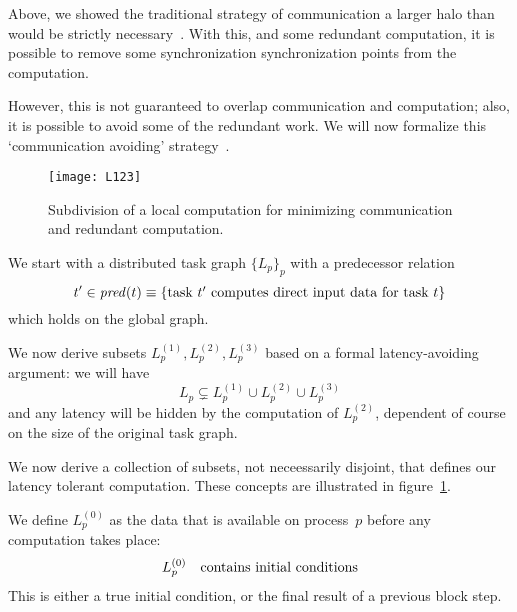 
\label{sec:avoid-framework}

Above, we showed the
traditional strategy of communication a larger halo than would be
strictly
necessary~\cite{Douglas:caching-multigrid,Eijkhout:poly-smooth,OpJo:improved-ssor}.
With this, and some redundant computation, it is possible to remove
some synchronization
synchronization points from the computation.

However, this is not guaranteed to overlap communication and
computation; also, it is possible to avoid some of the redundant work.
We will now formalize this `communication avoiding'
strategy~\cite{Demmel2008IEEE:avoiding}.

\begin{figure}[ht]
  \texttt{[image: L123]}
  \caption{Subdivision of a local computation for minimizing communication and redundant computation.}
  \label{fig:avoid}
\end{figure}

We start with a distributed task graph
$\{ L_{p} \}_{p}$ with a predecessor relation
\[ t' \in \mathop{\mathit{pred}}(t)\equiv \{\hbox{task $t'$ computes direct input data for
  task $t$}\}
\]
which holds on the global graph.

We now derive subsets
$L^{(1)}_{p},L^{(2)}_{p},L^{(3)}_{p}$
based on a formal latency-avoiding argument:
%
we will have
\[
    L_{p} \subsetneq L^{(1)}_{p} \cup L^{(2)}_{p} \cup L^{(3)}_{p}
\]
and any latency will be hidden by the computation of
$L^{(2)}_{p}$,
dependent of course on the size of the  original task graph.

We now derive a collection of subsets, not neceessarily disjoint, that
defines our latency tolerant computation.
These
concepts are illustrated in figure~\ref{fig:avoid}.


We define
$L^{(0)}_{p}$
as the data that is available
on process~$p$
before any computation takes place:
\[
L^{(0)}_{p} \quad\hbox{contains initial conditions}
\]
This is either a true initial condition, or the final result of a
previous block step.

